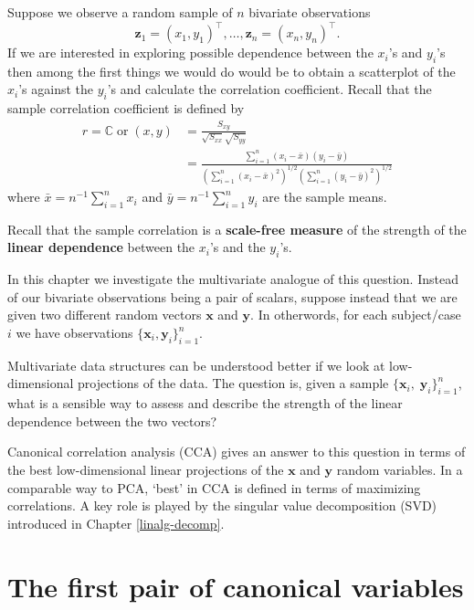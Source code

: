 \documentclass[
]{book}
\theoremstyle{definition}
\theoremstyle{definition}
\theoremstyle{definition}
\theoremstyle{definition}
\theoremstyle{remark}
\begin{document}
Suppose we observe a random sample of \(n\) bivariate observations
\[
\mathbf z_1=(x_1,y_1)^\top , \ldots , \mathbf z_n=(x_n,y_n)^\top.
\]
If we are interested in exploring possible dependence between the \(x_i\)'s and \(y_i\)'s then among the first things we would do would be to obtain a scatterplot of the \(x_i\)'s against the \(y_i\)'s and calculate the correlation coefficient. Recall that the sample correlation coefficient is defined by
\begin{align}
r={\mathbb{C}\operatorname{or}}(x,y)&=\frac{S_{xy}}{\sqrt{S_{xx}}\sqrt{S_{yy}}}\\
&=\frac{\sum_{i=1}^n (x_i-\bar{x})(y_i-\bar{y})}{\left(\sum_{i=1}^n (x_i-\bar{x})^2  \right)^{1/2}  \left(\sum_{i=1}^n (y_i-\bar{y})^2 \right)^{1/2}}
\label{eq:scr}
\end{align}
where \(\bar{x}=n^{-1}\sum_{i=1}^n x_i\) and \(\bar{y}=n^{-1}\sum_{i=1}^n y_i\) are the sample means.

Recall that the sample correlation is a \textbf{scale-free measure} of the strength of the \textbf{linear dependence} between the \(x_i\)'s and the \(y_i\)'s.

In this chapter we investigate the multivariate analogue of this question. Instead of our bivariate observations being a pair of scalars, suppose instead that we are given two different random vectors \(\mathbf x\) and \(\mathbf y\). In otherwords, for each subject/case \(i\) we have observations
\(\{\mathbf x_i,\mathbf y_i\}_{i=1}^n.\)

Multivariate data structures can be understood better if we look at low-dimensional projections of the data. The question is, given a sample \(\{\mathbf x_i, \; \mathbf y_i\}_{i=1}^{n}\), what is a sensible way to assess and describe the strength of the linear dependence between the two vectors?

Canonical correlation analysis (CCA) gives an answer to this question in terms of the best low-dimensional linear projections of the \(\mathbf x\) and \(\mathbf y\) random variables. In a comparable way to PCA, `best' in CCA is defined in terms of maximizing correlations.
A key role is played by the singular value decomposition (SVD) introduced in Chapter \ref{linalg-decomp}.

\hypertarget{cca1}{%
\section{The first pair of canonical variables}\label{cca1}}
\end{document}
